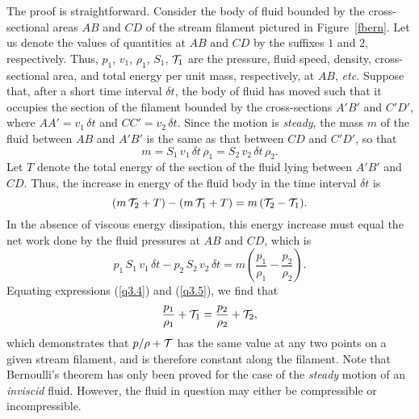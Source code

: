 The proof is straightforward. Consider the body of fluid bounded by the cross-sectional areas $AB$ and $CD$ of the stream filament
pictured in Figure~\ref{fbern}.  Let us denote the values of quantities at $AB$ and $CD$ by the suffixes $1$ and
$2$, respectively. Thus, $p_1$, $v_1$, $\rho_1$, $S_1$, ${\cal T}_1$ are the pressure, fluid speed, density, cross-sectional
area, and total energy per unit mass, respectively, at $AB$, {\em etc.} Suppose that, after a short time interval $\delta t$, the body of fluid has moved such
that it occupies the section of the filament bounded by the cross-sections $A'B'$ and $C'D'$, where
$AA'=v_1\,\delta t$ and $CC'=v_2\,\delta t$. Since the motion is {\em steady}, the mass $m$ of the fluid between $AB$
and $A'B'$ is the same as that between $CD$ and $C'D'$, so that
\begin{equation}
m= S_1\,v_1\,\delta t\,\rho_1=S_2\,v_2\,\delta t\,\rho_2.
\end{equation}
Let $T$ denote the total energy of the section of the fluid lying between $A'B'$ and $CD$. Thus, the increase in energy 
of the fluid body in the time interval $\delta t$ is
\begin{equation}\label{q3.4}
(m\,{\cal T}_2+T)-(m\,{\cal T}_1+T)=m\,({\cal T}_2-{\cal T}_1).
\end{equation}
In the absence of viscous energy dissipation, this energy increase must equal the net work done by the fluid pressures at
$AB$ and $CD$, which is
\begin{equation}\label{q3.5}
p_1\,S_1\,v_1\,\delta t - p_2\,S_2\,v_2\,\delta t = m\left(\frac{p_1}{\rho_1}-\frac{p_2}{\rho_2}\right).
\end{equation}
Equating expressions (\ref{q3.4}) and (\ref{q3.5}), we find that
\begin{equation}
\frac{p_1}{\rho_1}+ {\cal T}_1= \frac{p_2}{\rho_2}+{\cal T}_2,
\end{equation}
which demonstrates that $p/\rho+{\cal T}$ has the same value at any two points on a given stream filament, and is therefore constant along the filament. Note that Bernoulli's theorem has only been proved for the case of the {\em steady}\/ motion of an {\em inviscid}\/ fluid. However,
the fluid in question may either be compressible or incompressible.  

